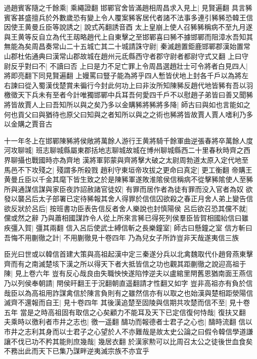 過趙賓客隨之千餘乘|{
	乘繩證翻}
邯鄲官舍皆滿趙相周昌求入見上|{
	見賢遍翻}
具言豨賓客甚盛擅兵於外數歲恐有變上令人覆案豨客居代者諸不法事多連引豨豨恐韓王信因使王黄曼丘臣等說誘之|{
	說式芮翻誘音酉}
太上皇崩上使人召豨豨稱病不至九月遂與王黄等反自立為代王刼略趙代上自東擊之至邯鄲喜曰豨不據邯鄲而阻漳水吾知其無能為矣周昌奏常山二十五城亡其二十城請誅守尉|{
	秦滅趙置鉅鹿邯鄲郡漢始置常山郡杜佑通典曰漢常山郡故城在趙州元氐縣西守者郡守尉者都尉守式又翻}
上曰守尉反乎對曰不|{
	不讀曰否}
上曰是力不足亡罪上令周昌選趙壯士可令將者白見四人|{
	將即亮翻下同見賢遍翻}
上嫚罵曰豎子能為將乎四人慙皆伏地上封各千戶以為將左右諫曰從入蜀漢伐楚賞未徧行今封此何功上曰非汝所知陳豨反趙代地皆豨有吾以羽檄徵天下兵未有至者今計唯獨邯鄲中兵耳吾何愛四千戶不以慰趙子弟皆曰善又聞豨將皆故賈人上曰吾知所以與之矣乃多以金購豨將豨將多降|{
	師古曰與如也言能如之何也貢父曰與猶待也原父曰知與之者知所以與之之術也豨將皆故賈人賈人嗜利乃多以金購之賈音古}


十一年冬上在邯鄲陳豨將侯敞將萬餘人游行王黄將騎千餘軍曲逆張春將卒萬餘人度河攻聊城|{
	班志聊城縣屬東郡括地志聊城故城在博州聊城縣西二十里春秋時齊之西界聊攝也戰國時亦為齊地}
漢將軍郭蒙與齊將擊大破之太尉周勃道太原入定代地至馬邑不下攻殘之|{
	殘謂多所殺戮}
趙利守東垣帝攻拔之更命曰真定|{
	更工衡翻}
帝購王黄曼丘臣以千金其麾下皆生致之於是陳豨軍遂敗淮隂侯信稱病不從擊豨隂使人至豨所與通謀信謀與家臣夜詐詔赦諸官徒奴|{
	有罪而居作者為徒有罪而没入官者為奴}
欲發以襲呂后太子部署已定待豨報其舍人得罪於信信囚欲殺之春正月舍人弟上變告信欲反狀於呂后|{
	按班書功臣表告信反者舍人樂說也封慎陽侯}
呂后欲召恐其儻不就|{
	儻或然之辭}
乃與蕭相國謀詐令人從上所來言豨已得死列侯羣臣皆賀相國紿信曰雖疾彊入賀|{
	彊其兩翻}
信入呂后使武士縛信斬之長樂鐘室|{
	師古曰懸鐘之室}
信方斬曰吾悔不用蒯徹之計|{
	不用蒯徹見十卷四年}
乃為兒女子所詐豈非天哉遂夷信三族

臣光曰世或以韓信首建大策與高祖起漢中定三秦遂分兵以北禽魏取代仆趙脅燕東擊齊而有之南滅楚垓下漢之所以得天下者大抵皆信之功也觀其距蒯徹之說迎高祖于陳|{
	見上卷六年}
豈有反心哉良由失職怏怏遂陷悖逆夫以盧綰里閈舊恩猶南面王燕信乃以列侯奉朝請|{
	閈侯旰翻王于況翻朝直遥翻請才性翻又如字}
豈非高祖亦有負於信哉臣以為高祖用詐謀禽信於陳言負則有之雖然信亦有以取之也始漢與楚相距滎陽信滅齊不還報而自王|{
	見十卷四年}
其後漢追楚至固陵與信期共攻楚而信不至|{
	見十卷五年}
當是之時高祖固有取信之心矣顧力不能耳及天下已定信復何恃哉|{
	復扶又翻}
夫乘時以徼利者市井之志也|{
	徼一遥翻}
醻功而報德者士君子之心也|{
	醻時流翻}
信以市井之志利其身而以士君子之心望於人不亦難哉是故太史公論之曰假令韓信學道謙讓不伐已功不矜其能則庶幾哉|{
	幾居衣翻}
於漢家勲可以比周召太公之徒後世血食矣不務出此而天下已集乃謀畔逆夷滅宗族不亦宜乎

